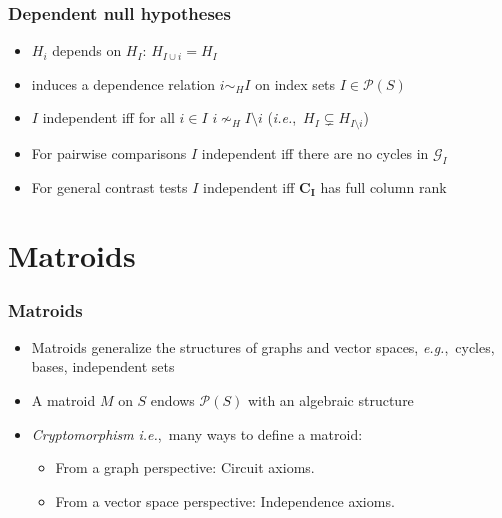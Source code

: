 \documentclass[bigger]{beamer}
\newcommand{\bs}[1]{\bm{#1}}
\newcommand{\ie}{{\sl i.e.},~}
\newcommand{\eg}{{\sl e.g.},~}
\begin{document}
\begin{frame}
\frametitle{Dependent null hypotheses}

\begin{itemize}
\item $H_i$ depends on $H_I$: $H_{I \cup i} = H_{I}$
\item induces a dependence relation $i \sim_H I$ on index sets $I \in \mathcal{P}(S)$
\item $I$ independent iff for all $i
  \in I$ $i \nsim_H I\setminus i$ (\ie $H_{I} \subsetneq H_{I\setminus i}$)
\pause
\item For pairwise comparisons $I$ independent iff there are no cycles in $\mathscr{G}_I$
\item For general contrast tests $I$ independent iff $\bs{C_I}$ has full
 column rank
\end{itemize} %
\end{frame}



\section{Matroids}



\begin{frame}
\frametitle{Matroids}
\begin{itemize}

\item Matroids generalize the structures of graphs and vector spaces,
 \eg cycles, bases, independent sets
\item A matroid $M$ on $S$ endows $\mathcal{P}(S)$ with an algebraic
 structure
\item {\em Cryptomorphism} \ie many ways to define a matroid:
 \begin{itemize}
 \item From a graph perspective: Circuit axioms.
 \item From a vector space perspective: Independence axioms.
 \end{itemize}
\end{itemize} %
\end{frame}
\end{document}

